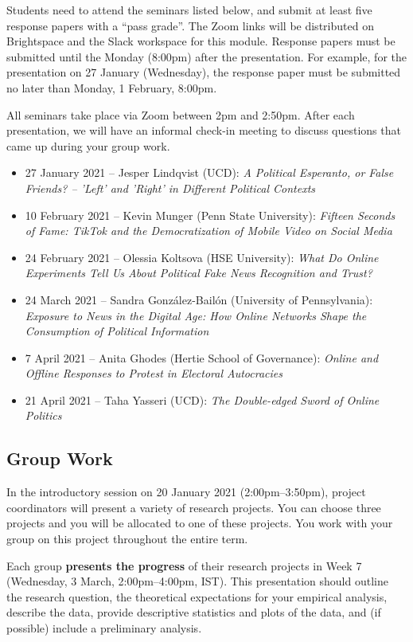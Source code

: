 \documentclass[abstract=on,parskip=full,headings=standardclasses,fontsize=11pt,paper=a4]{scrartcl}
\begin{document}
 
Students need to attend the seminars listed below, and submit at least five response papers with a ``pass grade''. The Zoom links will be distributed on Brightspace and the Slack workspace for this module.  Response papers must be submitted until the Monday (8:00pm) after the presentation. For example, for the presentation on 27 January (Wednesday), the response paper must be submitted no later than Monday, 1 February, 8:00pm.


All seminars take place via Zoom between 2pm and 2:50pm. After each presentation, we will have an informal check-in meeting to discuss questions that came up during your group work.

\begin{itemize}
\item 27 January 2021 -- Jesper Lindqvist (UCD): \textit{A Political Esperanto, or False Friends? – 'Left' and 'Right' in Different Political Contexts}
\item 10 February 2021 -- Kevin Munger (Penn State University): \textit{Fifteen Seconds of Fame: TikTok and the Democratization of Mobile Video on Social Media}
\item 24 February 2021 -- Olessia Koltsova (HSE University): \textit{What Do Online Experiments Tell Us About Political Fake News Recognition and Trust?}
\item 24 March 2021 -- Sandra González-Bailón (University of Pennsylvania): \textit{Exposure to News in the Digital Age: How Online Networks Shape the Consumption of Political Information}
\item 7 April 2021 -- Anita Ghodes (Hertie School of Governance): \textit{Online and Offline Responses to Protest in Electoral Autocracies}
\item 21 April 2021 -- Taha Yasseri (UCD): \textit{The Double-edged Sword of Online Politics}
\end{itemize}


\subsection*{Group Work}

In the introductory session on 20 January 2021 (2:00pm--3:50pm), project coordinators will present a variety of research projects. You can choose three projects and you will be allocated to one of these projects. You work with your group on this project throughout the entire term. 

Each group \textbf{presents the progress} of their research projects in Week 7 (Wednesday, 3 March, 2:00pm--4:00pm, IST). This presentation should outline the research question, the theoretical expectations for your empirical analysis, describe the data, provide descriptive statistics and plots of the data, and (if possible) include a preliminary analysis. 
\end{document}
